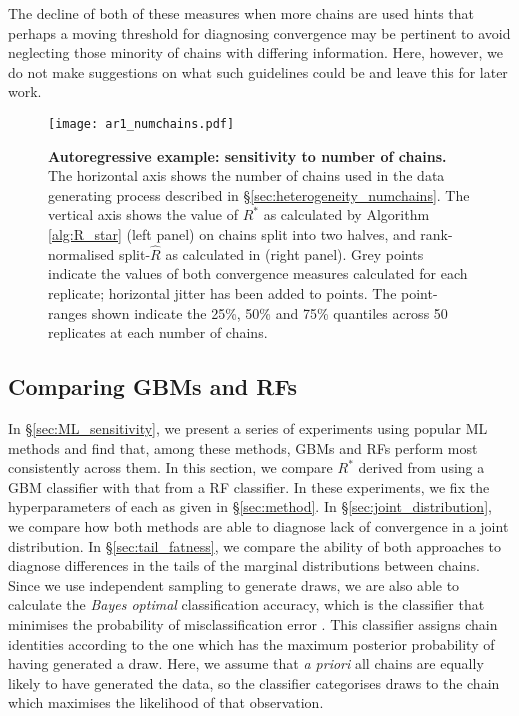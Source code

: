\documentclass{article}
\begin{document}
The decline of both of these measures when more chains are used hints that perhaps a moving threshold for diagnosing convergence may be pertinent to avoid neglecting those minority of chains with differing information. Here, however, we do not make suggestions on what such guidelines could be and leave this for later work.

\begin{figure}[!htb]
	\centerline{\texttt{[image: ar1\_numchains.pdf]}}
	\caption{\textbf{Autoregressive example: sensitivity to number of chains.} The horizontal axis shows the number of chains used in the data generating process described in \S\ref{sec:heterogeneity_numchains}. The vertical axis shows the value of $R^*$ as calculated by Algorithm \ref{alg:R_star} (left panel) on chains split into two halves, and rank-normalised split-$\widehat{R}$ as calculated in \cite{vehtari2019rank} (right panel). Grey points indicate the values of both convergence measures calculated for each replicate; horizontal jitter has been added to points. The point-ranges shown indicate the 25\%, 50\% and 75\% quantiles across 50 replicates at each number of chains.}
	\label{fig:ar1_numchains}
\end{figure}

\color{red}
\subsection{Comparing GBMs and RFs}\label{sec:comparison_gbm_rf}
In \S\ref{sec:ML_sensitivity}, we present a series of experiments using popular ML methods and find that, among these methods, GBMs and RFs perform most consistently across them. In this section, we compare $R^*$ derived from using a GBM classifier with that from a RF classifier. In these experiments, we fix the hyperparameters of each as given in \S\ref{sec:method}. In \S\ref{sec:joint_distribution}, we compare how both methods are able to diagnose lack of convergence in a joint distribution. In \S\ref{sec:tail_fatness}, we compare the ability of both approaches to diagnose differences in the tails of the marginal distributions between chains. Since we use independent sampling to generate draws, we are also able to calculate the \textit{Bayes optimal} classification accuracy, which is the classifier that minimises the probability of misclassification error \citep{devroye2013probabilistic}. This classifier assigns chain identities according to the one which has the maximum posterior probability of having generated a draw. Here, we assume that \textit{a priori} all chains are equally likely to have generated the data, so the classifier categorises draws to the chain which maximises the likelihood of that observation.
\end{document}
